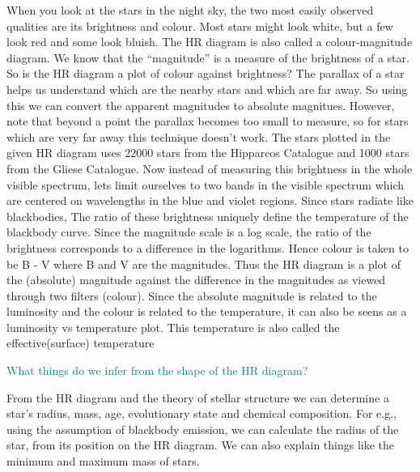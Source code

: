 \documentclass{../template/texnote}
\begin{document}
When you look at the stars in the night sky, the two most easily observed qualities are its brightness and colour.
Most stars might look white, but a few look red and some look bluish.
The HR diagram is also called a colour-magnitude diagram.
We know that the ``magnitude'' is a measure of the brightness of a star.
So is the HR diagram a plot of colour against brightness?
The parallax of a star helps us understand which are the nearby stars and which are far away.
So using this we can convert the apparent magnitudes to absolute magnitues.
However, note that beyond a point the parallax becomes too small to measure, so for stars which are very far away this technique doesn't work.
The stars plotted in the given HR diagram uses 
22000 stars from the Hipparcos Catalogue and
1000 stars from the Gliese Catalogue.
Now instead of measuring this brightness in the whole visible spectrum, lets limit ourselves to two bands in the visible spectrum which are centered on wavelengths in the blue and violet regions.
Since stars radiate like blackbodies,
The ratio of these brightness uniquely define the temperature of the blackbody curve.
Since the magnitude scale is a log scale, the ratio of the brightness corresponds to a difference in the logarithms.
Hence colour is taken to be B - V where B and V are the magnitudes.
Thus the HR diagram is a plot of the (absolute) magnitude against the difference in the magnitudes as viewed through two filters (colour).
Since the absolute magnitude is related to the luminosity and the colour is related to the temperature, it can also be seens as a luminosity vs temperature plot.
This temperature is also called the effective(surface) temperature 

\textcolor{teal}{What things do we infer from the shape of the HR diagram?}

From the HR diagram and the theory of stellar structure we can determine a star's radius, mass, age, evolutionary state and chemical composition.
For e.g., using the assumption of blackbody emission, we can calculate the radius of the star, from its position on the HR diagram.
We can also explain things like the minimum and maximum mass of stars.
\end{document}
